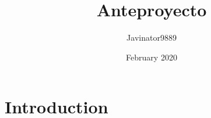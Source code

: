 \documentclass{article}
\title{Anteproyecto}
\author{Javinator9889 }
\date{February 2020}
\begin{document}
\maketitle

\section{Introduction}
\end{document}
